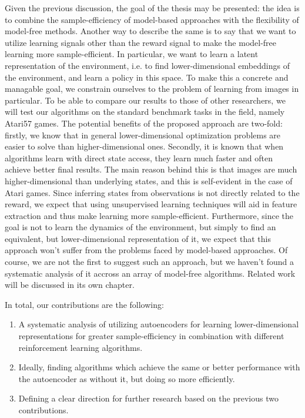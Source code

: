 Given the previous discussion, the goal of the thesis may be presented:
the idea is to combine the sample-efficiency of model-based approaches
with the flexibility of model-free methods.
Another way to describe the same is to say that we want
to utilize learning signals other than the reward signal
to make the model-free learning more sample-efficient.
In particular, we want to learn a latent representation of the environment,
i.e. to find lower-dimensional embeddings of the environment,
and learn a policy in this space.
To make this a concrete and managable goal,
we constrain ourselves to the problem of learning from images in particular.
To be able to compare our results to those of other researchers,
we will test our algorithms on the standard benchmark tasks in the field,
namely Atari57 games.
The potential benefits of the proposed approach are two-fold:
firstly, we know that in general lower-dimensional optimization problems
are easier to solve than higher-dimensional ones.
Secondly, it is known that when algorithms learn with direct state access,
they learn much faster and often achieve better final results.
The main reason behind this is that images are much higher-dimensional
than underlying states, and this is self-evident in the case of Atari games.
Since inferring states from observations is not directly related to the reward,
we expect that using unsupervised learning techniques will aid in feature extraction
and thus make learning more sample-efficient.
Furthermore, since the goal is not to learn the dynamics of the environment,
but simply to find an equivalent, but lower-dimensional representation of it,
we expect that this approach won't suffer from the problems faced
by model-based approaches.
Of course, we are not the first to suggest such an approach,
but we haven't found a systematic analysis of it accross an array of
model-free algorithms.
Related work will be discussed in its own chapter.

In total, our contributions are the following:
\begin{enumerate}
    \item A systematic analysis of utilizing autoencoders for learning lower-dimensional
    representations for greater sample-efficiency in combination with different
    reinforcement learning algorithms.
    \item Ideally, finding algorithms which achieve the same or better performance with the autoencoder
    as without it, but doing so more efficiently.
    \item Defining a clear direction for further research based on the previous two contributions.
\end{enumerate}





